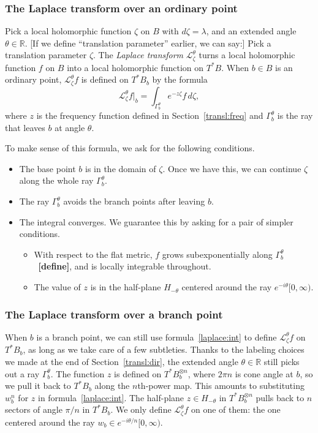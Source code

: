 \documentclass{article}
\newcommand{\R}{\mathbb{R}}
\newcommand{\laplace}{\mathcal{L}}
\begin{document}
\subsubsection{The Laplace transform over an ordinary point}%
Pick a local holomorphic function $\zeta$ on $B$ with $d\zeta = \lambda$, and an extended angle $\theta \in \R$. \textcolor{VioletRed}{[If we define ``translation parameter'' earlier, we can say:] Pick a translation parameter $\zeta$.} The {\em Laplace transform} $\laplace_\zeta^\theta$ turns a local holomorphic function $f$ on $B$ into a local holomorphic function on $T^*B$. When $b \in B$ is an ordinary point, $\laplace_\zeta^\theta f$ is defined on $T^*B_b$ by the formula
\begin{equation}\label{laplace:int}
\laplace_\zeta^\theta f\big|_b = \int_{\Gamma_b^\theta} e^{-z\zeta} f\,d\zeta,
\end{equation}
where $z$ is the frequency function defined in Section~\ref{transl:freq} and $\Gamma_b^\theta$ is the ray that leaves $b$ at angle $\theta$.

To make sense of this formula, we ask for the following conditions.
\begin{itemize}
\item The base point $b$ is in the domain of $\zeta$. Once we have this, we can continue $\zeta$ along the whole ray $\Gamma_b^\theta$.
\item The ray $\Gamma_b^\theta$ avoids the branch points after leaving $b$.
\item The integral converges. We guarantee this by asking for a pair of simpler conditions.
\begin{itemize}
\item With respect to the flat metric, $f$ grows subexponentially along $\Gamma_b^\theta$~\textbf{[define]}, and is locally integrable throughout.
\item The value of $z$ is in the half-plane $H_{-\theta}$ centered around the ray $e^{-i\theta} [0, \infty)$.
\end{itemize}
\end{itemize}
\subsubsection{The Laplace transform over a branch point}
When $b$ is a branch point, we can still use formula~\ref{laplace:int} to define $\laplace_\zeta^\theta f$ on $T^*B_b$, as long as we take care of a few subtleties. Thanks to the labeling choices we made at the end of Section~\ref{transl:dir}, the extended angle $\theta \in \R$ still picks out a ray $\Gamma_b^\theta$. The function $z$ is defined on $T^*B_b^{\otimes n}$, where $2\pi n$ is cone angle at $b$, so we pull it back to $T^*B_b$ along the $n$th-power map. This amounts to substituting $w_b^n$ for $z$ in formula~\ref{laplace:int}. The half-plane $z \in H_{-\theta}$ in $T^*B_b^{\otimes n}$ pulls back to $n$ sectors of angle $\pi/n$ in $T^*B_b$. We only define $\laplace_\zeta^\theta f$ on one of them: the one centered around the ray $w_b \in e^{-i\theta/n}[0, \infty)$.
\end{document}

